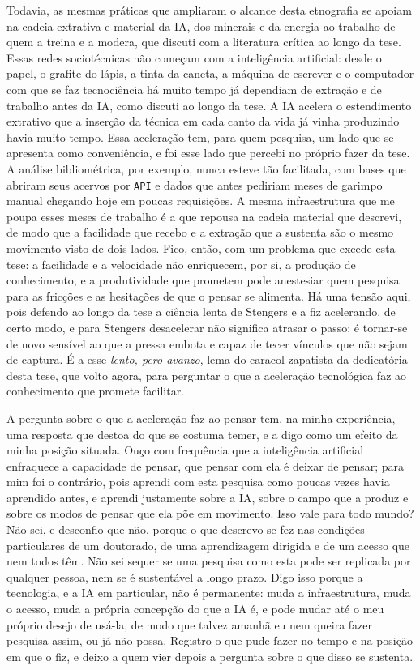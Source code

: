 Todavia, as mesmas práticas que ampliaram o alcance desta etnografia se apoiam na cadeia extrativa e material da IA, dos minerais e da energia ao trabalho de quem a treina e a modera, que discuti com a literatura crítica ao longo da tese. Essas redes sociotécnicas não começam com a inteligência artificial: desde o papel, o grafite do lápis, a tinta da caneta, a máquina de escrever e o computador com que se faz tecnociência há muito tempo já dependiam de extração e de trabalho antes da IA, como discuti ao longo da tese. A IA acelera o estendimento extrativo que a inserção da técnica em cada canto da vida já vinha produzindo havia muito tempo. Essa aceleração tem, para quem pesquisa, um lado que se apresenta como conveniência, e foi esse lado que percebi no próprio fazer da tese. A análise bibliométrica, por exemplo, nunca esteve tão facilitada, com bases que abriram seus acervos por \texttt{API} e dados que antes pediriam meses de garimpo manual chegando hoje em poucas requisições. A mesma infraestrutura que me poupa esses meses de trabalho é a que repousa na cadeia material que descrevi, de modo que a facilidade que recebo e a extração que a sustenta são o mesmo movimento visto de dois lados. Fico, então, com um problema que excede esta tese: a facilidade e a velocidade não enriquecem, por si, a produção de conhecimento, e a produtividade que prometem pode anestesiar quem pesquisa para as fricções e as hesitações de que o pensar se alimenta. Há uma tensão aqui, pois defendo ao longo da tese a ciência lenta de Stengers e a fiz acelerando, de certo modo, e para Stengers desacelerar não significa atrasar o passo: é tornar-se de novo sensível ao que a pressa embota e capaz de tecer vínculos que não sejam de captura. É a esse \emph{lento, pero avanzo}, lema do caracol zapatista da dedicatória desta tese, que volto agora, para perguntar o que a aceleração tecnológica faz ao conhecimento que promete facilitar.

A pergunta sobre o que a aceleração faz ao pensar tem, na minha experiência, uma resposta que destoa do que se costuma temer, e a digo como um efeito da minha posição situada. Ouço com frequência que a inteligência artificial enfraquece a capacidade de pensar, que pensar com ela é deixar de pensar; para mim foi o contrário, pois aprendi com esta pesquisa como poucas vezes havia aprendido antes, e aprendi justamente sobre a IA, sobre o campo que a produz e sobre os modos de pensar que ela põe em movimento. Isso vale para todo mundo? Não sei, e desconfio que não, porque o que descrevo se fez nas condições particulares de um doutorado, de uma aprendizagem dirigida e de um acesso que nem todos têm. Não sei sequer se uma pesquisa como esta pode ser replicada por qualquer pessoa, nem se é sustentável a longo prazo. Digo isso porque a tecnologia, e a IA em particular, não é permanente: muda a infraestrutura, muda o acesso, muda a própria concepção do que a IA é, e pode mudar até o meu próprio desejo de usá-la, de modo que talvez amanhã eu nem queira fazer pesquisa assim, ou já não possa. Registro o que pude fazer no tempo e na posição em que o fiz, e deixo a quem vier depois a pergunta sobre o que disso se sustenta.


